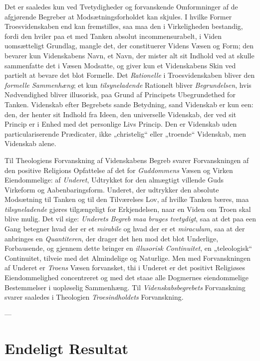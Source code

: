 \documentclass[12pt,a4paper]{book}
\newcommand{\opage}[1]{\marginnote{\footnotesize\textit{[#1]}}}
\begin{document}
Det er saaledes kun ved Tvetydigheder og forvanskende Omformninger af de afgjørende
Begreber at Modsætningsforholdet kan skjules. I hvilke Former Troesvidenskaben end kan
fremstilles, saa maa den i Virkeligheden bestandig, fordi den hviler paa et med Tanken
absolut incommensurabelt, i Viden uomsætteligt Grundlag, mangle det, der constituerer
Videns Væsen og Form; den bevarer kun Videnskabens Navn, et Navn, der mister alt sit
Indhold ved at skulle sammenfatte det i Væsen Modsatte, og giver kun et Videnskabens Skin
ved partielt at bevare det blot Formelle. Det \emph{Rationelle} i Troesvidenskaben bliver den \emph{formelle Sammenhæng}; et kun \emph{tilsyneladende} Rationelt bliver \emph{Begrundelsen}, hvis
Nødvendighed bliver illusorisk, paa Grund af Principets Ubegrundethed for Tanken.
Videnskab efter Begrebets sande Betydning, sand Videnskab er kun een: den, der henter sit
Indhold fra Ideen, den universelle Videnskab, der ved sit Princip er i Enhed med det
personlige Livs Princip. Den er Videnskab uden particulariserende Prædicater, ikke
„christelig“ eller „troende“ Videnskab, men Videnskab alene.

Til Theologiens Forvanskning af Videnskabens Begreb svarer Forvanskningen af den positive
Religions Opfattelse af det for \emph{Guddommens} Væsen og Virken Eiendommelige: af \emph{Underet},
Udtrykket for den almægtigt villende Guds Virkeform og Aabenbaringsform. Underet, der
udtrykker den absolute Modsætning til Tanken og til den Tilværelses Lov, af hvilke Tanken
bæres, maa \emph{tilsyneladende} gjøres tilgængeligt for Erkjendelsen, naar en Viden om Troen skal
blive mulig. Det vil sige: \emph{Underets} \opage{117}\emph{Begreb maa bruges tvetydigt}, saa at det paa een Gang
betegner hvad der er et \textit{mirabile} og hvad der er et \textit{miraculum}, saa at der
anbringes en \emph{Quantiteren}, der drager det hen mod det blot Underlige, Forbausende, og
gjennem dette bringer en \emph{illusorisk Continuitet}, en „teleologisk“ Continuitet, tilveie med
det Almindelige og Naturlige. Men med Forvanskningen af Underet er \emph{Troens} Væsen
forvansket, thi i Underet er det positivt Religiøses Eiendommelighed concentreret og med
det staae alle Dogmernes eiendommelige Bestemmelser i uopløselig Sammenhæng. Til
\emph{Videnskabsbegrebets} Forvanskning svarer saaledes i Theologien \emph{Troesindholdets} Forvanskning.

\begin{center}---\end{center}

\section{Endeligt Resultat}
\label{sec:theologi-resultat}
\end{document}
